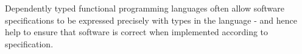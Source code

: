 Dependently typed functional programming languages often allow software specifications to be expressed precisely with types in the language - and hence help to ensure that software is correct when implemented according to specification.
